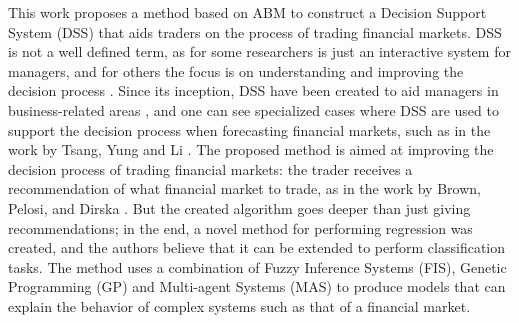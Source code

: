 \documentclass[12pt,journal,draftcls,onecolumn]{IEEEtran}
\begin{document}
This work proposes a method based on ABM to construct a Decision
Support System (DSS) that aids traders on the process of trading
financial markets. DSS is not a well defined term, as for some
researchers is just an interactive system for managers, and for others
the focus is on understanding and improving the decision process
\cite{keen1980decision}. Since its inception, DSS have been created to
aid managers in business-related areas \cite{Sprague1980}
\cite{little1979decision}, and one can see specialized cases where DSS
are used to support the decision process when forecasting financial
markets, such as in the work by Tsang, Yung and Li
\cite{Tsang2004}. The proposed method is aimed at improving the
decision process of trading financial markets: the trader receives a
recommendation of what financial market to trade, as in the work by
Brown, Pelosi, and Dirska \cite{brown2013dynamic}. But the created
algorithm goes deeper than just giving recommendations; in the end, a
novel method for performing regression was created, and the authors
believe that it can be extended to perform classification tasks. The
method uses a combination of Fuzzy Inference Systems (FIS), Genetic
Programming (GP) \cite{poli2008field} \cite{Koza1992} and Multi-agent
Systems (MAS) \cite{Shoham2009} to produce models that can explain the
behavior of complex systems such as that of a financial market.
\end{document}
